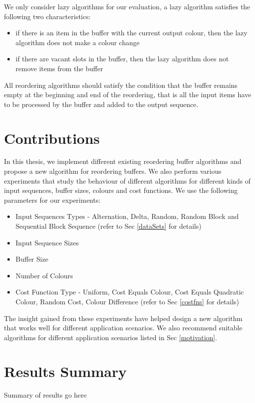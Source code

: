 We only consider lazy algorithms for our evaluation, a lazy algorithm satisfies
the following two characteristics: 

\begin{itemize}
  \item if there is an item in the buffer with the current output colour, then
  the lazy algorithm does not make a colour change
  \item if there are vacant slots in the buffer, then the lazy algorithm does not
  remove items from the buffer
\end{itemize}

All reordering algorithms should satisfy the condition that the buffer remains empty at the beginning and end of the reordering, that is all the input items have to be processed by the buffer and added to the output sequence. 

\section{Contributions}

In this thesis, we implement different existing reordering buffer algorithms
and propose a new algorithm for reordering buffers. We also perform various
experiments that study the behaviour of different algorithms for different
kinds of input sequences, buffer sizes, colours and cost functions. We use the following
parameters for our experiments:
\begin{itemize}
  \item Input Sequences Types - Alternation, Delta, Random, Random Block and Sequential Block Sequence (refer to Sec \ref{dataSets} for details)
  \item Input Sequence Sizes
  \item Buffer Size
  \item Number of Colours
  \item Cost Function Type - Uniform, Cost Equals Colour, Cost Equals Quadratic Colour, Random Cost, Colour Difference (refer to Sec \ref{costfns} for details)
\end{itemize}

The insight gained from these experiments have helped design a new algorithm that works well for different application scenarios. We also recommend suitable algorithms for different application scenarios listed in Sec \ref{motivation}.

\section{Results Summary}
Summary of results go here 

